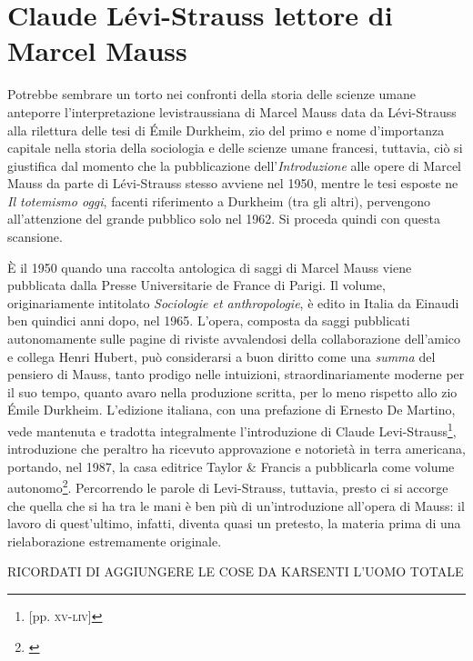 \section{Claude Lévi-Strauss lettore di Marcel Mauss}
Potrebbe sembrare un torto nei confronti della storia delle scienze umane anteporre l'interpretazione levistraussiana di Marcel Mauss data da Lévi-Strauss alla rilettura delle tesi di Émile Durkheim, zio del primo e nome d'importanza capitale nella storia della sociologia e delle scienze umane francesi, tuttavia, ciò si giustifica dal momento che la pubblicazione dell'\textit{Introduzione} alle opere di Marcel Mauss da parte di Lévi-Strauss stesso avviene nel 1950, mentre le tesi esposte ne \textit{Il totemismo oggi}, facenti riferimento a Durkheim (tra gli altri), pervengono all'attenzione del grande pubblico solo nel 1962. Si proceda quindi con questa scansione.

È il 1950 quando una raccolta antologica di saggi di Marcel Mauss viene pubblicata dalla Presse Universitarie de France di Parigi. Il volume, originariamente intitolato \textit{Sociologie et anthropologie}, è edito in Italia da Einaudi ben quindici anni dopo, nel 1965. 
L'opera, composta da saggi pubblicati autonomamente sulle pagine di riviste avvalendosi della collaborazione dell'amico e collega Henri Hubert, può considerarsi a buon diritto come una \textit{summa} del pensiero di Mauss, tanto prodigo nelle intuizioni, straordinariamente moderne per il suo tempo, quanto avaro nella produzione scritta, per lo meno rispetto allo zio Émile Durkheim.
L'edizione italiana, con una prefazione di Ernesto De Martino, vede mantenuta e tradotta integralmente l'introduzione di Claude Levi-Strauss\footnote{\cite{mauss1965teoria} [pp. \textsc{xv-liv}]}, introduzione che peraltro ha ricevuto approvazione e notorietà in terra americana, portando, nel 1987, la casa editrice Taylor \& Francis a pubblicarla come volume autonomo\footnote{\cite{levi1987introduction}}. Percorrendo le parole di Levi-Strauss, tuttavia, presto ci si accorge che quella che si ha tra le mani è ben più di un'introduzione all'opera di Mauss: il lavoro di quest'ultimo, infatti, diventa quasi un pretesto, la materia prima di una rielaborazione estremamente originale.

RICORDATI DI AGGIUNGERE LE COSE DA KARSENTI L'UOMO TOTALE \cite{karsenti1997uomo}

